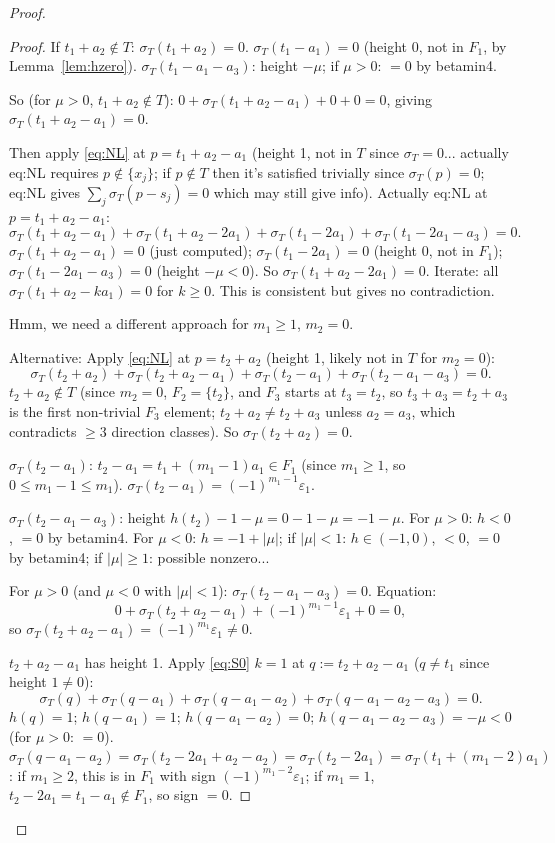 \begin{proof}
\begin{proof}
If $t_1+a_2 \notin T$: $\sigma_T(t_1+a_2)=0$.
$\sigma_T(t_1-a_1)=0$ (height 0, not in $F_1$, by Lemma~\ref{lem:hzero}).
$\sigma_T(t_1-a_1-a_3)$: height $-\mu$; if $\mu>0$: $=0$ by betamin4.

So (for $\mu>0$, $t_1+a_2 \notin T$): $0+\sigma_T(t_1+a_2-a_1)+0+0=0$, giving $\sigma_T(t_1+a_2-a_1)=0$.

Then apply \eqref{eq:NL} at $p = t_1+a_2-a_1$ (height 1, not in $T$ since $\sigma_T=0$... actually eq:NL requires $p \notin \{x_j\}$; if $p \notin T$ then it's satisfied trivially since $\sigma_T(p)=0$; eq:NL gives $\sum_j \sigma_T(p-s_j)=0$ which may still give info). Actually eq:NL at $p=t_1+a_2-a_1$:
\[
  \sigma_T(t_1+a_2-a_1)+\sigma_T(t_1+a_2-2a_1)+\sigma_T(t_1-2a_1)+\sigma_T(t_1-2a_1-a_3)=0.
\]
$\sigma_T(t_1+a_2-a_1)=0$ (just computed); $\sigma_T(t_1-2a_1)=0$ (height 0, not in $F_1$); $\sigma_T(t_1-2a_1-a_3)=0$ (height $-\mu<0$). So $\sigma_T(t_1+a_2-2a_1)=0$. Iterate: all $\sigma_T(t_1+a_2-ka_1)=0$ for $k \geq 0$. This is consistent but gives no contradiction.

Hmm, we need a different approach for $m_1 \geq 1$, $m_2=0$.

Alternative: Apply \eqref{eq:NL} at $p = t_2+a_2$ (height 1, likely not in $T$ for $m_2=0$):
\[
  \sigma_T(t_2+a_2)+\sigma_T(t_2+a_2-a_1)+\sigma_T(t_2-a_1)+\sigma_T(t_2-a_1-a_3)=0.
\]
$t_2+a_2 \notin T$ (since $m_2=0$, $F_2=\{t_2\}$, and $F_3$ starts at $t_3=t_2$, so $t_3+a_3 = t_2+a_3$ is the first non-trivial $F_3$ element; $t_2+a_2 \neq t_2+a_3$ unless $a_2=a_3$, which contradicts $\geq 3$ direction classes). So $\sigma_T(t_2+a_2)=0$.

$\sigma_T(t_2-a_1)$: $t_2-a_1=t_1+(m_1-1)a_1 \in F_1$ (since $m_1 \geq 1$, so $0 \leq m_1-1 \leq m_1$). $\sigma_T(t_2-a_1)=(-1)^{m_1-1}\varepsilon_1$.

$\sigma_T(t_2-a_1-a_3)$: height $h(t_2)-1-\mu = 0-1-\mu = -1-\mu$. For $\mu > 0$: $h < 0$, $=0$ by betamin4. For $\mu < 0$: $h = -1+|\mu|$; if $|\mu|<1$: $h \in (-1,0)$, $<0$, $=0$ by betamin4; if $|\mu| \geq 1$: possible nonzero...

For $\mu > 0$ (and $\mu < 0$ with $|\mu|<1$): $\sigma_T(t_2-a_1-a_3)=0$. Equation:
\[
  0+\sigma_T(t_2+a_2-a_1)+(-1)^{m_1-1}\varepsilon_1+0=0,
\]
so $\sigma_T(t_2+a_2-a_1) = (-1)^{m_1}\varepsilon_1 \neq 0$.

$t_2+a_2-a_1$ has height 1. Apply \eqref{eq:S0} $k=1$ at $q:=t_2+a_2-a_1$ ($q \neq t_1$ since height $1 \neq 0$):
\[
  \sigma_T(q)+\sigma_T(q-a_1)+\sigma_T(q-a_1-a_2)+\sigma_T(q-a_1-a_2-a_3)=0.
\]
$h(q)=1$; $h(q-a_1)=1$; $h(q-a_1-a_2)=0$; $h(q-a_1-a_2-a_3)=-\mu<0$ (for $\mu>0$: $=0$).
$\sigma_T(q-a_1-a_2) = \sigma_T(t_2-2a_1+a_2-a_2)=\sigma_T(t_2-2a_1)=\sigma_T(t_1+(m_1-2)a_1)$: if $m_1 \geq 2$, this is in $F_1$ with sign $(-1)^{m_1-2}\varepsilon_1$; if $m_1=1$, $t_2-2a_1=t_1-a_1 \notin F_1$, so sign $=0$.


\end{proof}
\end{proof}
